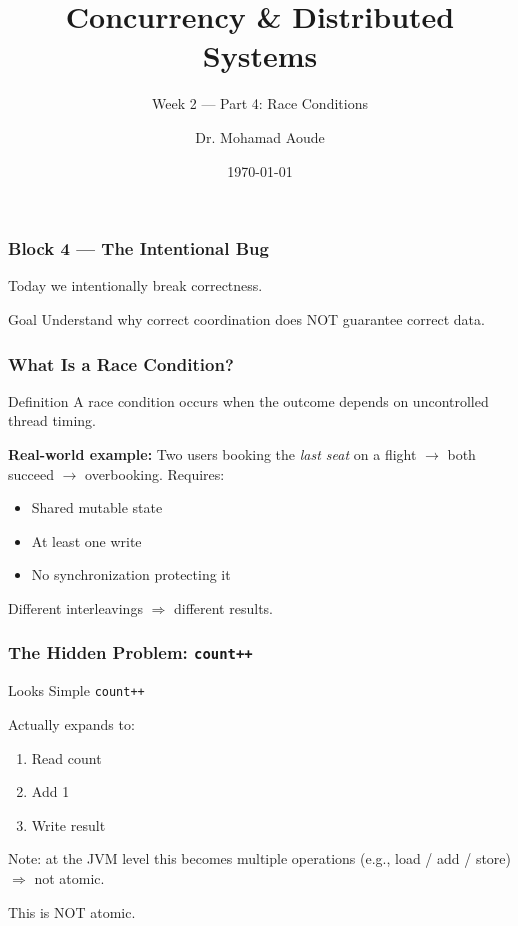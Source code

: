 \documentclass[aspectratio=169,11pt]{beamer}
\title{Concurrency \& Distributed Systems}
\subtitle{Week 2 --- Part 4: Race Conditions}
\author{Dr. Mohamad Aoude}
\institute{Lebanese University \\ Faculty of Engineering}
\date{\today}
\begin{document}
	
	\begin{frame}
		\titlepage
	\end{frame}
	
	\begin{frame}
		\frametitle{Block 4 --- The Intentional Bug}
		\begin{center}
			\Large Today we intentionally break correctness.
		\end{center}
		\vspace{6mm}
		\begin{block}{Goal}
			Understand why correct coordination does NOT guarantee correct data.
		\end{block}
	\end{frame}
	
	\begin{frame}
		\frametitle{What Is a Race Condition?}
		\begin{block}{Definition}
			A race condition occurs when the outcome depends on uncontrolled thread timing.
		\end{block}
		\vspace{3mm}
		\textbf{Real-world example:} Two users booking the \emph{last seat} on a flight $\rightarrow$ both succeed $\rightarrow$ overbooking.
		\vspace{4mm}
		Requires:
		\begin{itemize}
			\item Shared mutable state
			\item At least one write
			\item No synchronization protecting it
		\end{itemize}
		\vspace{3mm}
		\begin{center}
			\Large Different interleavings $\Rightarrow$ different results.
		\end{center}
	\end{frame}
	
	\begin{frame}
		\frametitle{The Hidden Problem: \texttt{count++}}
		\begin{block}{Looks Simple}
			\texttt{count++}
		\end{block}
		\vspace{4mm}
		Actually expands to:
		\begin{enumerate}
			\item Read count
			\item Add 1
			\item Write result
		\end{enumerate}
		\vspace{2mm}
		{\footnotesize\alert{Note:} at the JVM level this becomes multiple operations (e.g., load / add / store) $\Rightarrow$ not atomic.}
		\vspace{4mm}
		\begin{center}
			\Large This is NOT atomic.
		\end{center}
	\end{frame}
	
\end{document}
